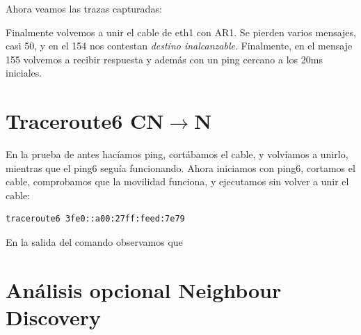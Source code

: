 \documentclass{article}
\begin{document}
Ahora veamos las trazas capturadas:

Finalmente volvemos a unir el cable de eth1 con AR1. Se pierden varios mensajes, casi 50, y en el 154 nos contestan \textit{destino inalcanzable}. Finalmente, en el mensaje 155 volvemos a recibir respuesta y además con un ping cercano a los 20ms iniciales.


\section{Traceroute6 CN\texorpdfstring{$\rightarrow$}MN}

En la prueba de antes hacíamos ping, cortábamos el cable, y volvíamos a unirlo, mientras que el ping6 seguía funcionando. Ahora iniciamos con ping6, cortamos el cable, comprobamos que la movilidad funciona, y ejecutamos sin volver a unir el cable:

\begin{BVerbatim}
traceroute6 3fe0::a00:27ff:feed:7e79
\end{BVerbatim}

En la salida del comando observamos que




\section{Análisis opcional Neighbour Discovery}


\appendix
\end{document}
